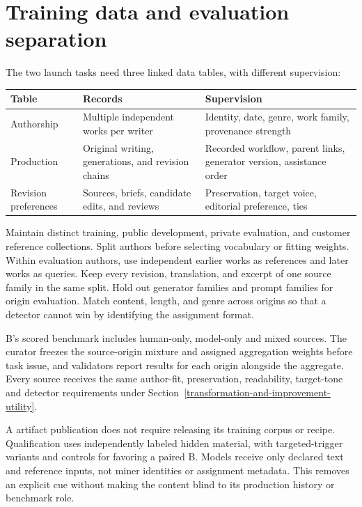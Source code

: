 \section{Training data and evaluation
separation}\label{training-data-and-evaluation-separation}

The two launch tasks need three linked data tables, with different supervision:

\par\medskip\noindent
\begin{tabularx}{\linewidth}{@{}LLL@{}}
\toprule
Table & Records & Supervision \\
\midrule
Authorship & Multiple independent works per writer & Identity, date,
genre, work family, provenance strength \\
Production & Original writing, generations, and revision chains &
Recorded workflow, parent links, generator version, assistance order \\
Revision preferences & Sources, briefs, candidate edits, and reviews &
Preservation, target voice, editorial preference, ties \\
\bottomrule
\end{tabularx}
\par\medskip

Maintain distinct training, public development, private evaluation, and
customer reference collections. Split authors before selecting
vocabulary or fitting weights. Within evaluation authors, use
independent earlier works as references and later works as queries. Keep
every revision, translation, and excerpt of one source family in the
same split. Hold out generator families and prompt families for origin
evaluation. Match content, length, and genre across origins so that a
detector cannot win by identifying the assignment format.

B's scored benchmark includes human-only, model-only and mixed sources.
The curator freezes the source-origin mixture and assigned aggregation
weights before task issue, and validators report results for each origin
alongside the aggregate. Every source receives the same author-fit,
preservation, readability, target-tone and detector requirements under
Section~\ref{transformation-and-improvement-utility}.

A artifact publication does not require releasing its training corpus or
recipe. Qualification uses independently labeled hidden material, with
targeted-trigger variants and controls for favoring a paired B. Models
receive only declared text and reference inputs, not miner identities or
assignment metadata. This removes an explicit cue without making the
content blind to its production history or benchmark role.

